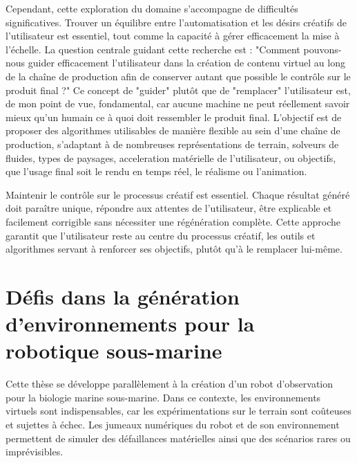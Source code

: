 Cependant, cette exploration du domaine s'accompagne de difficultés significatives. Trouver un équilibre entre l'automatisation et les désirs créatifs de l'utilisateur est essentiel, tout comme la capacité à gérer efficacement la mise à l'échelle.
La question centrale guidant cette recherche est : "Comment pouvons-nous guider efficacement l'utilisateur dans la création de contenu virtuel au long de la chaîne de production afin de conserver autant que possible le contrôle sur le produit final ?" Ce concept de "guider" plutôt que de "remplacer" l'utilisateur est, de mon point de vue, fondamental, car aucune machine ne peut réellement savoir mieux qu'un humain ce à quoi doit ressembler le produit final. L'objectif est de proposer des algorithmes utilisables de manière flexible au sein d'une chaîne de production, s'adaptant à de nombreuses représentations de terrain, solveurs de fluides, types de paysages, acceleration matérielle de l'utilisateur, ou objectifs, que l'usage final soit le rendu en temps réel, le réalisme ou l'animation.

Maintenir le contrôle sur le processus créatif est essentiel. Chaque résultat généré doit paraître unique, répondre aux attentes de l'utilisateur, être explicable et facilement corrigible sans nécessiter une régénération complète. Cette approche garantit que l'utilisateur reste au centre du processus créatif, les outils et algorithmes servant à renforcer ses objectifs, plutôt qu'à le remplacer lui-même.

\section*{Défis dans la génération d'environnements pour la robotique sous-marine}

Cette thèse se développe parallèlement à la création d'un robot d'observation pour la biologie marine sous-marine. Dans ce contexte, les environnements virtuels sont indispensables, car les expérimentations sur le terrain sont coûteuses et sujettes à échec. Les jumeaux numériques du robot et de son environnement permettent de simuler des défaillances matérielles ainsi que des scénarios rares ou imprévisibles.

